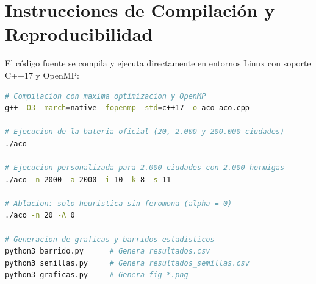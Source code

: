 \documentclass[11pt,a4paper]{article}
\begin{document}
\section{Instrucciones de Compilación y Reproducibilidad}

El código fuente se compila y ejecuta directamente en entornos Linux con soporte C++17 y OpenMP:

\begin{lstlisting}[language=bash]
# Compilacion con maxima optimizacion y OpenMP
g++ -O3 -march=native -fopenmp -std=c++17 -o aco aco.cpp

# Ejecucion de la bateria oficial (20, 2.000 y 200.000 ciudades)
./aco

# Ejecucion personalizada para 2.000 ciudades con 2.000 hormigas
./aco -n 2000 -a 2000 -i 10 -k 8 -s 11

# Ablacion: solo heuristica sin feromona (alpha = 0)
./aco -n 20 -A 0

# Generacion de graficas y barridos estadisticos
python3 barrido.py      # Genera resultados.csv
python3 semillas.py     # Genera resultados_semillas.csv
python3 graficas.py     # Genera fig_*.png
\end{lstlisting}
\end{document}

